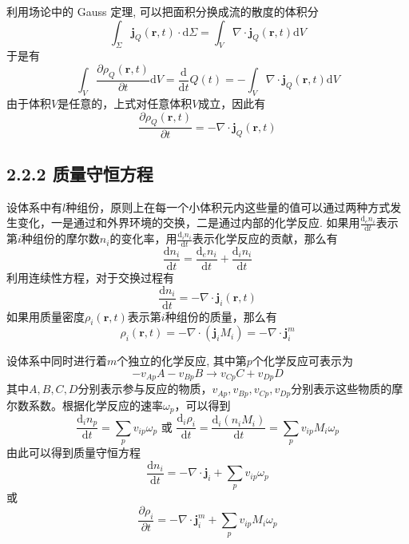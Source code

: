 \documentclass[10pt,aspectratio=43,mathserif,table]{ctexbeamer}
\begin{document}
\begin{frame}
    利用场论中的 Gauss 定理, 可以把面积分换成流的散度的体积分
    $$
    \int_{\Sigma}{\mathbf{j}_Q\left( \mathbf{r}, t \right)\cdot \mathrm{d}\Sigma}=\int_V{\nabla \cdot \mathbf{j}_Q\left( \mathbf{r}, t \right)\mathrm{d}V}
    $$
    于是有
    $$
    \int_V{\frac{\partial \rho _Q\left( \mathbf{r}, t \right)}{\partial t}\mathrm{d}V}=\frac{\mathrm{d}}{\mathrm{d}t}Q\left( t \right) =-\int_V{\nabla \cdot \mathbf{j}_Q\left( \mathbf{r},t \right) \mathrm{d}V}
    $$
    由于体积$V$是任意的，上式对任意体积$V$成立，因此有
    \begin{equation}\label{eq:1}
        \frac{\partial \rho _Q\left( \mathbf{r}, t \right)}{\partial t}=-\nabla \cdot \mathbf{j}_Q\left( \mathbf{r}, t \right)
    \end{equation}
\end{frame}

\subsection{2.2.2 质量守恒方程}
\begin{frame}
    设体系中有$l$种组份，原则上在每一个小体积元内这些量的值可以通过两种方式发生变化，一是通过和外界环境的交换，二是通过内部的化学反应. 如果用$\frac{\mathrm{d}_{e}n_i}{\mathrm{d}t}$表示第$i$种组份的摩尔数$n_i$的变化率，用$\frac{\mathrm{d}_{i}n_i}{\mathrm{d}t}$表示化学反应的贡献，那么有
    $$
    \frac{\mathrm{d}n_i}{\mathrm{d}t}=\frac{\mathrm{d}_{e}n_i}{\mathrm{d}t}+\frac{\mathrm{d}_{i}n_i}{\mathrm{d}t}
    $$
    利用连续性方程，对于交换过程有
    $$
    \frac{\mathrm{d}n_i}{\mathrm{d}t}=-\nabla \cdot \mathbf{j}_i(\mathbf{r},t)
    $$
    如果用质量密度$\rho _i(\mathbf{r},t)$表示第$i$种组份的质量，那么有
    $$
    \rho _i(\mathbf{r},t)=-\nabla \cdot (\mathbf{j}_i M_i)=-\nabla \cdot \mathbf{j}_{i}^{m}
    $$
\end{frame}

\begin{frame}
    设体系中同时进行着$m$个独立的化学反应, 其中第$p$个化学反应可表示为
    $$
    -v_{Ap}A-v_{Bp}B\rightarrow v_{Cp}C+v_{Dp}D
    $$
    其中$A,B,C,D$分别表示参与反应的物质，$v_{Ap},v_{Bp},v_{Cp},v_{Dp}$分别表示这些物质的摩尔数系数。根据化学反应的速率$\omega_p$，可以得到
    \begin{equation}\label{eq:2.1}
        \frac{\mathrm{d}_in_p}{\mathrm{d}t}=\sum_p{v_{ip}\omega _p}\text{\ 或\ }\frac{\mathrm{d}_i\rho _i}{\mathrm{d}t}=\frac{\mathrm{d}_i\left( n_iM_i \right)}{\mathrm{d}t}=\sum_p{v_{ip}M_i\omega _p}
    \end{equation}
    由此可以得到质量守恒方程
    $$
    \frac{\mathrm{d}n_i}{\mathrm{d}t}=-\nabla \cdot \mathbf{j}_i+\sum_p{v_{ip}\omega _p}
    $$
    或
    $$
    \frac{\partial \rho _i}{\partial t}=-\nabla \cdot \mathbf{j}_{i}^{m}+\sum_p{v_{ip}M_i\omega _p}
    $$

\end{frame}
\end{document}
